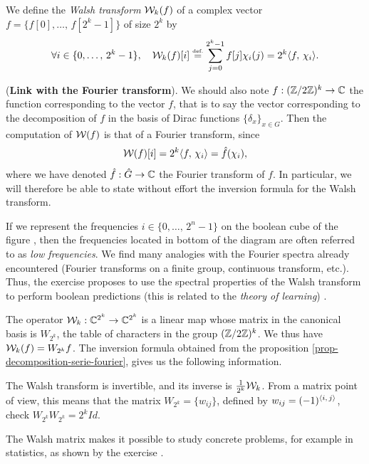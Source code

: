 \begin{defn}
 \label{notation-33} We define the \textit{Walsh transform} $ \mathcal{W}_k (f) $ of a complex vector $ f = \{f [0], \ldots, \, f [2^k-1]\} $ of size $ 2^k $ by
\begin{equation}
\label{eq-formula-defn-trans-walsh}
\forall i \in \{0, \ldots, \, 2^k-1\}, \quad \mathcal{W}_k (f) [i] \stackrel{\mbox{\upshape\tiny def.}}{=} \sum_{j = 0}^{2^k-1}{f [j] \chi_i (j)} = 2^k \langle f,\,\chi_i\rangle.
\end{equation}
\end{defn}
 
 
\begin{rem}{(\upshape \textbf{Link with the Fourier transform}).} 
We should also note $ f: (\mathbb{Z}/2 \mathbb{Z})^k \rightarrow \mathbb{C} $ the function corresponding to the vector $ f $, that is to say the vector corresponding to the decomposition of $ f $ in the basis of Dirac functions $ \{\delta_x\}_{x \in G} $. Then the computation of $ \mathcal{W} (f) $ is that of a Fourier transform, since
\begin{equation*}
\mathcal{W} (f) [i] = 2^k \langle f,\,\chi_i\rangle = \hat{f} (\chi_i),
\end{equation*}
where we have denoted $ \hat{f}: \hat{G} \rightarrow \mathbb{C} $ the Fourier transform of $ f $. In particular, we will therefore be able to state without effort the inversion formula for the Walsh transform.
\end{rem}
If we represent the frequencies $ i \in \{0, \ldots, \, 2^n-1\} $ on the boolean cube of the figure , then the frequencies located in bottom of the diagram are often referred to as \textit{low frequencies}. We find many analogies with the Fourier spectra already encountered (Fourier transforms on a finite group, continuous transform, etc.). Thus, the exercise  proposes to use the spectral properties of the Walsh transform to perform boolean predictions (this is related to the \textit{theory of learning}) .
 
 
The operator $ \mathcal{W}_k: \mathbb{C}^{2^k} \rightarrow \mathbb{C}^{2^k} $ is a linear map whose matrix in the canonical basis is $ W_{2^k} $, the table of characters in the group $ (\mathbb{Z}/2 \mathbb{Z})^k $. We thus have $ \mathcal{W}_k (f) = W_{2^k} f $. The inversion formula obtained from the proposition \ref{prop-decomposition-serie-fourier}, gives us the following information.
 
\begin{prop}
\label{prop-pte-matrix-hadamard}
 The Walsh transform is invertible, and its inverse is $ \frac{1}{2^k} \mathcal{W}_k $. From a matrix point of view, this means that the matrix $ W_{2^k} = \{w_{ij}\} $, defined by $ w_{ij} = (-1)^{\langle i,\,j\rangle} $, check $ W_{2^k} W_{2^k} = 2^k Id $.
\end{prop}
The Walsh matrix makes it possible to study concrete problems, for example in statistics, as shown by the exercise .


